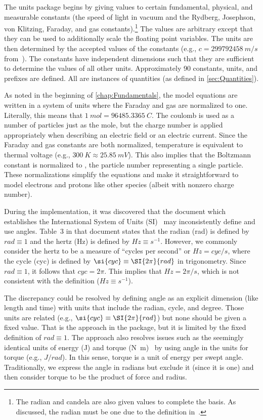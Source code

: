 The units package begins by giving values to certain fundamental, physical, and measurable constants (the speed of light in vacuum and the Rydberg, Josephson, von Klitzing, Faraday, and gas constants).\footnote{The radian and candela are also given values to complete the basis.  As discussed, the radian must be one due to the definition in~\cite{BIPM2006}.}  The values are arbitrary except that they can be used to additionally scale the floating point variables.  The units are then determined by the accepted values of the constants (e.g., $c = \SI{299792458}{m/s}$ from~\cite{NIST2010}).  The constants have independent dimensions such that they are sufficient to determine the values of all other units.  Approximately 90 constants, units, and prefixes are defined.  All are instances of quantities (as defined in \autoref{sec:Quantities}).

As noted in the beginning of \autoref{chap:Fundamentals}, the model equations are written in a system of units where the Faraday and gas are normalized to one.  Literally, this means that $\SI{1}{mol} = \SI{96485.3365}{C}$.  The coulomb is used as a number of particles just as the mole, but the charge number is applied appropriately when describing an electric field or an electric current.  Since the Faraday and gas constants are both normalized, temperature is equivalent to thermal voltage (e.g., $\SI{300}{K} \approx \SI{25.85}{mV}$).  This also implies that the Boltzmann constant is normalized to , the particle number representing a single particle.  These normalizations simplify the equations and make it straightforward to model electrons and protons like other species (albeit with nonzero charge number).

During the implementation, it was discovered that the document which establishes the International System of Units (SI)~\cite{BIPM2006} may inconsistently define and use angles.  Table~3 in that document states that the radian (rad) is defined by $\si{rad} \equiv 1$ and the hertz (Hz) is defined by $\si{Hz} \equiv \si{s^{-1}}$.  However, we commonly consider the hertz to be a measure of ``cycles per second'' or $\si{Hz} = \si{cyc}/\si{s}$, where the cycle (cyc) is defined by $\si{cyc} \equiv \SI{2\pi}{rad}$ in trigonometry.  Since $\si{rad} \equiv 1$, it follows that $\si{cyc} = 2\pi$.  This implies that $\si{Hz} = 2\pi/\si{s}$, which is not consistent with the  definition ($\si{Hz} \equiv \si{s^{-1}}$).

The discrepancy could be resolved by defining angle as an explicit dimension (like length and time) with units that include the radian, cycle, and degree.  Those units are related (e.g., $\si{cyc} \equiv \SI{2\pi}{rad}$) but none should be given a fixed value.  That is the approach in the  package, but it is limited by the fixed  definition of $\si{rad} \equiv 1$.  The approach also resolves issues such as the seemingly identical units of energy (\si{J}) and torque (\si{N.m})~\cite{McNish1957} by using angle in the units for torque (e.g., $\si{J/rad}$).  In this sense, torque is a unit of energy per swept angle.  Traditionally, we express the angle in radians but exclude it (since it is one) and then consider torque to be the product of force and radius.

